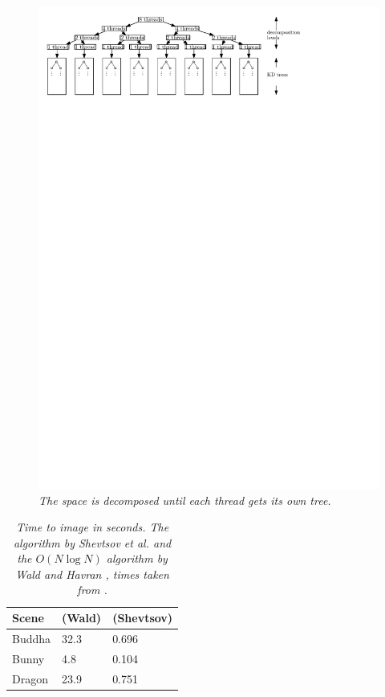 \documentclass[12pt]{article}
\begin{document}
\begin{figure}
\centering
  \includegraphics{figs/decomp}
  \caption{\textit{The space is decomposed until each thread gets its own tree.}}
  \label{fig:decomp}
\end{figure}
\begin{table}
\centering
\begin{tabular}{|l|l|l|}
\toprule
Scene & (Wald) & (Shevtsov) \\
\midrule
Buddha & 32.3 & 0.696\\
Bunny & 4.8 & 0.104\\
Dragon & 23.9 & 0.751\\
\bottomrule
\end{tabular}
\caption{\textit{Time to image in seconds. The algorithm by Shevtsov et al. \cite{hunt2006fast} and the $O(N\log N)$ algorithm by Wald and Havran \cite{wald2006building}, times taken from \cite{hunt2006fast}.}}
\label{table:13comp}
\end{table}
\end{document}
